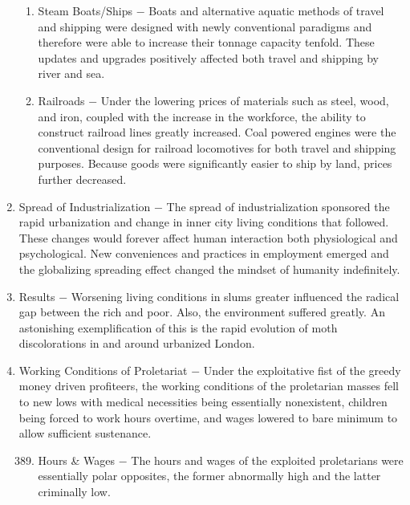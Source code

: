 \documentclass[12pt]{article}
\begin{document}
\begin{enumerate}
\begin{enumerate}[label=\arabic{*}.]
\item Steam Boats/Ships $-$ Boats and alternative aquatic methods of travel and shipping were designed with newly conventional paradigms and therefore were able to increase their tonnage capacity tenfold. These updates and upgrades positively affected both travel and shipping by river and sea.

\item Railroads $-$ Under the lowering prices of materials such as steel, wood, and iron, coupled with the increase in the workforce, the ability to construct railroad lines greatly increased. Coal powered engines were the conventional design for railroad locomotives for both travel and shipping purposes. Because goods were significantly easier to ship by land, prices further decreased.

\end{enumerate}
\setcounter{enumi}{385}

\item Spread of Industrialization $-$ The spread of industrialization sponsored the rapid urbanization and change in inner city living conditions that followed. These changes would forever affect human interaction both physiological and psychological. New conveniences and practices in employment emerged and the globalizing spreading effect changed the mindset of humanity indefinitely.

\item Results $-$ Worsening living conditions in slums greater influenced the radical gap between the rich and poor. Also, the environment suffered greatly. An astonishing exemplification of this is the rapid evolution of moth discolorations in and around urbanized London.

\item Working Conditions of Proletariat $-$ Under the exploitative fist of the greedy money driven profiteers, the working conditions of the proletarian masses fell to new lows with medical necessities being essentially nonexistent, children being forced to work hours overtime, and wages lowered to bare minimum to allow sufficient sustenance.

\begin{enumerate}[label=\arabic{*}.]
\setcounter{enumii}{388}

\item Hours \& Wages $-$ The hours and wages of the exploited proletarians were essentially polar opposites, the former abnormally high and the latter criminally low.


\end{enumerate}
\end{enumerate}
\end{document}
